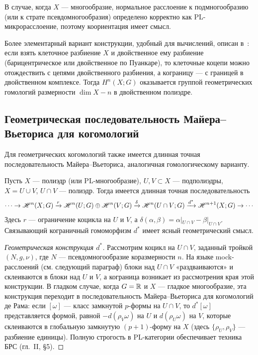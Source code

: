 \documentclass[12pt]{article}
\begin{document}
\begin{remark}
В случае, когда $X$ --- многообразие, нормальное расслоение к подмногообразию (или к страте псевдомногообразия) определено корректно как PL-микрорасслоение, поэтому коориентация имеет смысл.\footnotemark
\end{remark}
\begin{remark}
Более элементарный вариант конструкции, удобный для вычислений, описан в~\cite{Fenn}: если взять клеточное разбиение $X$ и двойственное ему разбиение (барицентрическое или двойственное по Пуанкаре), то клеточные коцепи можно отождествить с цепями двойственного разбиения, а кограницу --- с границей в двойственном комплексе. Тогда $H^n(X;G)$ оказывается группой геометрических гомологий размерности $\dim X - n$ в двойственном полиэдре.\footnotemark
\end{remark}

\subsection{Геометрическая последовательность Майера–Вьеториса для когомологий}

Для геометрических когомологий также имеется длинная точная последовательность Майера–Вьеториса, аналогичная гомологическому варианту.

\begin{theorem}\label{thm:MVcohom}
Пусть $X$ — полиэдр (или PL-многообразие), $U,V \subset X$ — подполиэдры, $X = U \cup V$, $U \cap V$ — полиэдр. Тогда имеется длинная точная последовательность
\[
\cdots \to \mathscr{H}^{n}(X;G) \xrightarrow{r} \mathscr{H}^{n}(U;G) \oplus \mathscr{H}^{n}(V;G) \xrightarrow{\delta} \mathscr{H}^{n}(U \cap V;G) \xrightarrow{d^*} \mathscr{H}^{n+1}(X;G) \to \cdots
\]
Здесь $r$ — ограничение коцикла на $U$ и $V$, а $\delta(\alpha,\beta) = \alpha|_{U\cap V} - \beta|_{U\cap V}$. Связывающий кограничный гомоморфизм $d^*$ имеет ясный геометрический смысл.
\end{theorem}

\begin{proof}[Геометрическая конструкция $d^*$]
Рассмотрим коцикл на $U \cap V$, заданный тройкой $(N,g,\nu)$, где $N$ — псевдомногообразие коразмерности $n$. На языке mock-расслоений (см. следующий параграф) блоки над $U \cap V$ «раздваиваются» и склеиваются в блоки над $U$ и $V$, а кограница возникает из рассмотрения края этой конструкции. В гладком случае, когда $G = \mathbb R$ и $X$ — гладкое многообразие, эта конструкция переходит в последовательность Майера–Вьеториса для когомологий де Рама: если $[\omega]$ — класс замкнутой $p$-формы на $U \cap V$, то $d^*[\omega]$ представляется формой, равной $-d(\rho_V \omega)$ на $U$ и $d(\rho_U \omega)$ на $V$, которые склеиваются в глобальную замкнутую $(p+1)$-форму на $X$ (здесь $\{\rho_U,\rho_V\}$ — разбиение единицы). Полную строгость в PL-категории обеспечивает техника БРС (гл.~II, §5). %
\end{proof}
\end{document}
